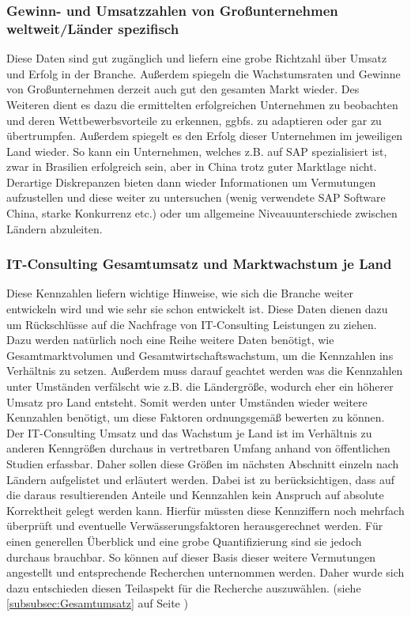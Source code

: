 \subsubsection{Gewinn- und Umsatzzahlen von Großunternehmen weltweit/Länder spezifisch}
Diese Daten sind gut zugänglich und liefern eine grobe Richtzahl über Umsatz und Erfolg in der Branche. 
Außerdem spiegeln die Wachstumsraten und Gewinne von Großunternehmen derzeit auch gut den gesamten Markt wieder. 
Des Weiteren dient es dazu die ermittelten erfolgreichen Unternehmen zu beobachten und deren  Wettbewerbsvorteile zu erkennen, ggbfs. zu adaptieren oder gar zu übertrumpfen.
Außerdem spiegelt es den Erfolg dieser Unternehmen im jeweiligen Land wieder. So kann ein Unternehmen, welches z.B. auf SAP spezialisiert ist, zwar in Brasilien erfolgreich sein, aber in China trotz guter Marktlage nicht. 
 Derartige Diskrepanzen bieten dann wieder Informationen um Vermutungen aufzustellen und diese weiter zu untersuchen (wenig verwendete SAP Software China, starke Konkurrenz etc.) oder um allgemeine Niveauunterschiede zwischen Ländern abzuleiten.

\subsubsection{IT-Consulting Gesamtumsatz und Marktwachstum je Land}
Diese Kennzahlen liefern wichtige Hinweise, wie sich die Branche weiter entwickeln wird und wie sehr sie schon entwickelt ist. 
Diese Daten dienen dazu um Rückschlüsse auf die Nachfrage von IT-Consulting Leistungen zu ziehen. 
Dazu werden natürlich noch eine Reihe weitere Daten benötigt, wie Gesamtmarktvolumen und Gesamtwirtschaftswachstum, um die Kennzahlen ins Verhältnis zu setzen.
 Außerdem muss darauf geachtet werden was die Kennzahlen unter Umständen verfälscht wie z.B. die Ländergröße, wodurch eher ein höherer Umsatz pro Land entsteht. 
 Somit werden unter Umständen wieder weitere Kennzahlen benötigt, um diese Faktoren ordnungsgemäß bewerten zu können.
Der IT-Consulting Umsatz und das Wachstum je Land ist im Verhältnis zu anderen Kenngrößen durchaus in vertretbaren Umfang anhand von öffentlichen Studien erfassbar. 
Daher sollen diese Größen im nächsten Abschnitt einzeln nach Ländern aufgelistet und erläutert werden. 
 Dabei ist zu berücksichtigen, dass auf die daraus resultierenden Anteile und Kennzahlen kein Anspruch auf absolute Korrektheit gelegt werden kann. 
 Hierfür müssten diese Kennziffern noch mehrfach überprüft und eventuelle Verwässerungsfaktoren herausgerechnet werden. 
 Für einen generellen Überblick und eine grobe Quantifizierung sind sie jedoch durchaus brauchbar. So können auf dieser Basis dieser weitere Vermutungen angestellt und entsprechende Recherchen unternommen werden.
Daher wurde sich dazu entschieden diesen Teilaspekt für die Recherche auszuwählen. (siehe  \ref{subsubsec:Gesamtumsatz}  auf Seite \pageref{subsubsec:Gesamtumsatz})

